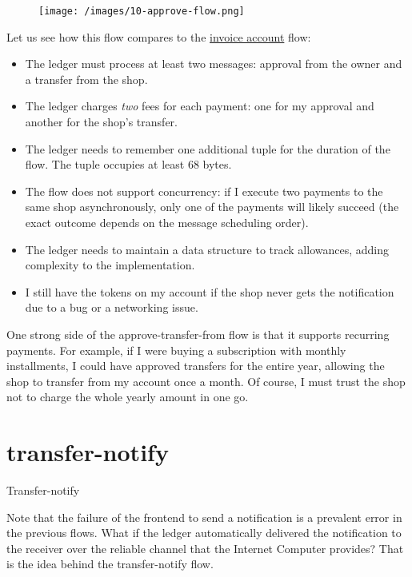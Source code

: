 \documentclass{article}
\begin{document}
\begin{figure}[grayscale-diagram]
\texttt{[image: /images/10-approve-flow.png]}
\end{figure}

Let us see how this flow compares to the \href{#invoice-account}{invoice account} flow:
\begin{itemize}
  \item The ledger must process at least two messages: approval from the owner and a transfer from the shop.
  \item The ledger charges \emph{two} fees for each payment: one for my approval and another for the shop's transfer.
  \item 
    The ledger needs to remember one additional  tuple for the duration of the flow.
    The tuple occupies at least 68 bytes.
  \item 
    The flow does not support concurrency: if I execute two payments to the same shop asynchronously, only one of the payments will likely succeed (the exact outcome depends on the message scheduling order).
  \item 
    The ledger needs to maintain a data structure to track allowances, adding complexity to the implementation.
  \item 
    I still have the tokens on my account if the shop never gets the notification due to a bug or a networking issue.
\end{itemize}

One strong side of the approve-transfer-from flow is that it supports recurring payments.
For example, if I were buying a subscription with monthly installments, I could have approved transfers for the entire year, allowing the shop to transfer from my account once a month.
Of course, I must trust the shop not to charge the whole yearly amount in one go.

\section{transfer-notify}{Transfer-notify}

Note that the failure of the frontend to send a notification is a prevalent error in the previous flows.
What if the ledger automatically delivered the notification to the receiver over the reliable channel that the Internet Computer provides?
That is the idea behind the transfer-notify flow.
\end{document}
